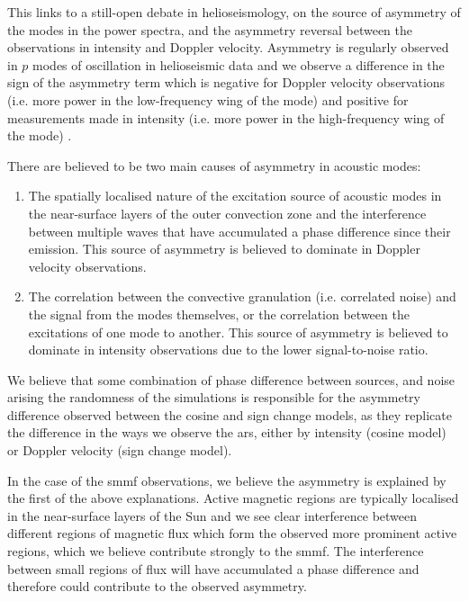 This links to a still-open debate in helioseismology, on the source of asymmetry of the modes in the power spectra, and the asymmetry reversal between the observations in intensity and Doppler velocity. Asymmetry is regularly observed in $p$ modes of oscillation in helioseismic data and we observe a difference in the sign of the asymmetry term which is negative for Doppler velocity observations (i.e. more power in the low-frequency wing of the mode) and positive for measurements made in intensity (i.e. more power in the high-frequency wing of the mode) \citep{duvall_asymmetries_1993, chaplin_depth_1999, howe_validation_2015, basu_asteroseismic_2017}.

There are believed to be two main causes of asymmetry in acoustic modes:

\begin{enumerate}
	\item{The spatially localised nature of the excitation source of acoustic modes in the near-surface layers of the outer convection zone and the interference between multiple waves that have accumulated a phase difference since their emission. This source of asymmetry is believed to dominate in Doppler velocity observations.}
	
	\item{The correlation between the convective granulation (i.e. correlated noise) and the signal from the modes themselves, or the correlation between the excitations of one mode to another. This source of asymmetry is believed to dominate in intensity observations due to the lower signal-to-noise ratio.}
\end{enumerate}

We believe that some combination of phase difference between sources, and noise arising the randomness of the simulations is responsible for the asymmetry difference observed between the cosine and sign change models, as they replicate the difference in the ways we observe the \glspl{ar}, either by intensity (cosine model) or Doppler velocity (sign change model).

In the case of the \gls{smmf} observations, we believe the asymmetry is explained by the first of the above explanations. Active magnetic regions are typically localised in the near-surface layers of the Sun and we see clear interference between different regions of magnetic flux which form the observed more prominent active regions, which we believe contribute strongly to the \gls{smmf}. The interference between small regions of flux will have accumulated a phase difference and therefore could contribute to the observed asymmetry.


